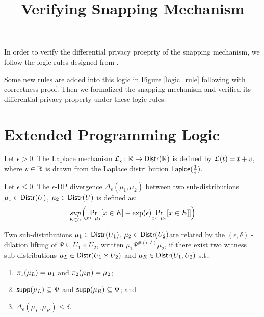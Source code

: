 \documentclass[a4paper,11pt]{article}
\begin{document}
\title{Verifying Snapping Mechanism}

\maketitle
In order to verify the differential privacy proeprty of the snapping mechanism\cite{mironov2012significance}, we follow the logic rules designed from \cite{barthe2016proving}.

Some new rules are added into this logic in Figure \ref{logic_rule} following with correctness proof. Then we formalized the snapping mechanism and verified its differential privacy property under these logic rules.

\section{Extended Programming Logic\cite{barthe2016proving}}
\begin{defn}
Let $\epsilon > 0$. The Laplace mechanism  $\mathcal{L}_{\epsilon}$: $\mathbb{R} \to \mathsf{Distr}(\mathbb{R})$ is defined by $\mathcal{L}(t) = t + v$, where $v \in \mathbb{R}$ is drawn from the Laplace distri bution $\mathsf{Laplce}(\frac{1}{\epsilon})$.
\end{defn}

\begin{defn}
Let $\epsilon \leq 0$. The $\epsilon${\text -DP divergence} $\Delta_{\epsilon}(\mu_1, \mu_2)$ between two sub-distributions $\mu_1 \in \mathsf{Distr}(U)$, $\mu_2 \in \mathsf{Distr}(U)$ is defined as:
\[	
	\underset{E \in U}{sup}\Big(\underset{x \leftarrow \mu_1}{\mathsf{Pr}}[x \in E] - \exp(\epsilon) \underset{x \leftarrow \mu_2}{\mathsf{Pr}}[x \in  E]]\Big)
\]

\end{defn}

\begin{defn}
Two sub-distributions $\mu_1 \in \mathsf{Distr}(U_1)$, $\mu_2 \in \mathsf{Distr}(U_2)$are related by the $(\epsilon, \delta)$ - dilation lifting of $\Psi \subseteq U_1 \times U_2$, written $\mu_1 \Psi^{\#(\epsilon, \delta)} \mu_2$, if there exist two witness sub-distributions $\mu_L \in \mathsf{Distr}(U_1 \times U_2)$ and $\mu_R \in \mathsf{Distr}(U_1, U_2)$ s.t.:
\begin{enumerate}
	\item $\pi_1(\mu_L) = \mu_1$ and $\pi_2(\mu_R) = \mu_2$;
	\item $\mathsf{supp}(\mu_L) \subseteq \Psi$ and $\mathsf{supp}(\mu_R) \subseteq \Psi$; and
	\item $\Delta_{\epsilon}(\mu_L, \mu_R) \leq \delta$.
\end{enumerate}
\end{defn}
\end{document}
